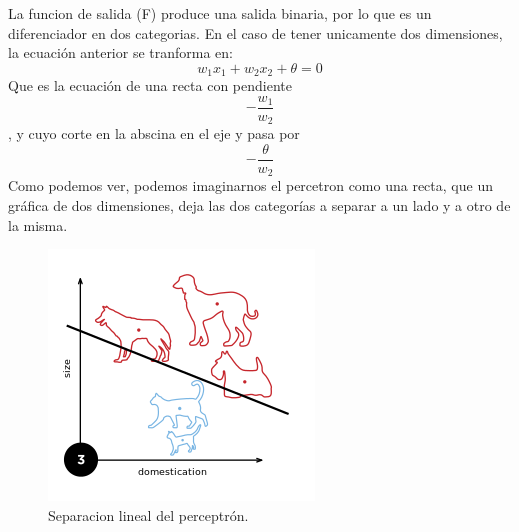 La funcion de salida (F) produce una salida binaria, por lo que es un diferenciador en dos categorias. En el caso de tener unicamente dos dimensiones, la ecuación anterior se tranforma en:
\begin{equation}
w_{1}x_{1} + w_{2}x_{2} + \theta = 0
\end{equation}
Que es la ecuación de una recta con pendiente \begin{equation}-\frac{w_{1}}{w_{2}}\end{equation}, y cuyo corte en la abscina en el eje y pasa por \begin{equation}-\frac{\theta}{w_{2}}\end{equation}
Como podemos ver, podemos imaginarnos el percetron como una recta, que un gráfica de dos dimensiones, deja las dos categorías a separar a un lado y a otro de la misma.
\begin{figure}[htp]
\centering
\includegraphics[scale=0.5]{images/Perceptron_example.png}
\caption{Separacion lineal del perceptrón.}
\end{figure}
